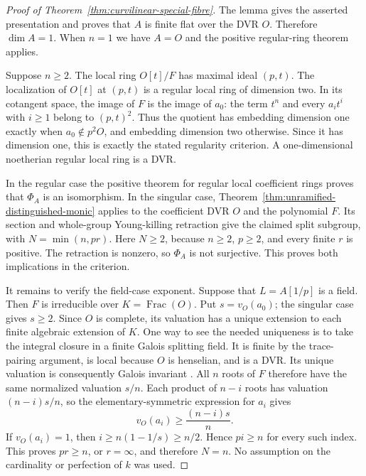 \begin{proof}[Proof of Theorem~\ref{thm:curvilinear-special-fibre}]
The lemma gives the asserted presentation and proves that $A$
is finite flat over the DVR $O$.  Therefore $\dim A=1$.
When $n=1$ we have $A=O$ and the positive regular-ring theorem
applies.

Suppose $n\geq2$.  The local ring $O[t]/F$ has maximal ideal
$(p,t)$.  The localization of $O[t]$ at $(p,t)$ is a regular
local ring of dimension two.  In its cotangent space, the
image of $F$ is the image of $a_0$: the term $t^n$ and every
$a_it^i$ with $i\geq1$ belong to $(p,t)^2$.  Thus the
quotient has embedding dimension one exactly when
$a_0\notin p^2O$, and embedding dimension two otherwise.
Since it has dimension one, this is exactly the stated
regularity criterion.  A one-dimensional noetherian regular
local ring is a DVR.

In the regular case the positive theorem for regular local
coefficient rings proves that $\Phi_A$ is an isomorphism.
In the singular case,
Theorem~\ref{thm:unramified-distinguished-monic} applies to
the coefficient DVR $O$ and the polynomial $F$.  Its section
and whole-group Young-killing retraction give the claimed
split subgroup, with $N=\min(n,pr)$.  Here $N\geq2$,
because $n\geq2$, $p\geq2$, and every finite $r$ is
positive.  The retraction is nonzero, so $\Phi_A$ is not
surjective.  This proves both implications in the criterion.

It remains to verify the field-case exponent.  Suppose that
$L=A[1/p]$ is a field.  Then $F$ is irreducible over
$K=\operatorname{Frac}(O)$.  Put $s=v_O(a_0)$; the
singular case gives $s\geq2$.  Since $O$ is complete, its
valuation has a unique extension to each finite algebraic
extension of $K$.  One way to see the needed uniqueness is
to take the integral closure in a finite Galois splitting
field.  It is finite by the trace-pairing argument, is local
because $O$ is henselian, and is a DVR.  Its unique valuation
is consequently Galois invariant
\citep[Lemmas~10.153.9 and~10.161.8, Tags~04GM and~032L;
Remark~15.113.6, Tag~09E8]{Stacks2026}.
All $n$ roots of $F$ therefore have the same normalized
valuation $s/n$.  Each product of $n-i$ roots has valuation
$(n-i)s/n$, so the elementary-symmetric expression for $a_i$
gives
\[
 v_O(a_i)\geq \frac{(n-i)s}{n}.
\]
If $v_O(a_i)=1$, then
$i\geq n(1-1/s)\geq n/2$.  Hence $pi\geq n$ for every
such index.  This proves $pr\geq n$, or $r=\infty$, and
therefore $N=n$.  No assumption on the cardinality or
perfection of $k$ was used.
\end{proof}

